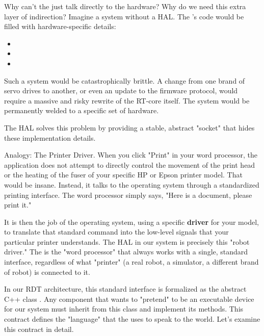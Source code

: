Why can't the  just talk directly to the hardware? Why do we need this extra layer of indirection? Imagine a system without a HAL. The 's code would be filled with hardware-specific details:
\begin{itemize}
    \item {}
    \item {}
    \item {}
\end{itemize}
Such a system would be catastrophically brittle. A change from one brand of servo drives to another, or even an update to the firmware protocol, would require a massive and risky rewrite of the RT-core itself. The system would be permanently welded to a specific set of hardware.

The HAL solves this problem by providing a stable, abstract "socket" that hides these implementation details.

\begin{tipbox}{Analogy: The Printer Driver.}
    When you click "Print" in your word processor, the application does not attempt to directly control the movement of the print head or the heating of the fuser of your specific HP or Epson printer model. That would be insane. Instead, it talks to the operating system through a standardized printing interface. The word processor simply says, "Here is a document, please print it."
    
    It is then the job of the operating system, using a specific \textbf{driver} for your model, to translate that standard command into the low-level signals that your particular printer understands. The HAL in our system is precisely this "robot driver." The  is the "word processor" that always works with a single, standard interface, regardless of what "printer" (a real robot, a simulator, a different brand of robot) is connected to it.
\end{tipbox}

In our RDT architecture, this standard interface is formalized as the abstract C++ class \textbf{}. Any component that wants to "pretend" to be an executable device for our system must inherit from this class and implement its methods. This contract defines the "language" that the  uses to speak to the world. Let's examine this contract in detail.


